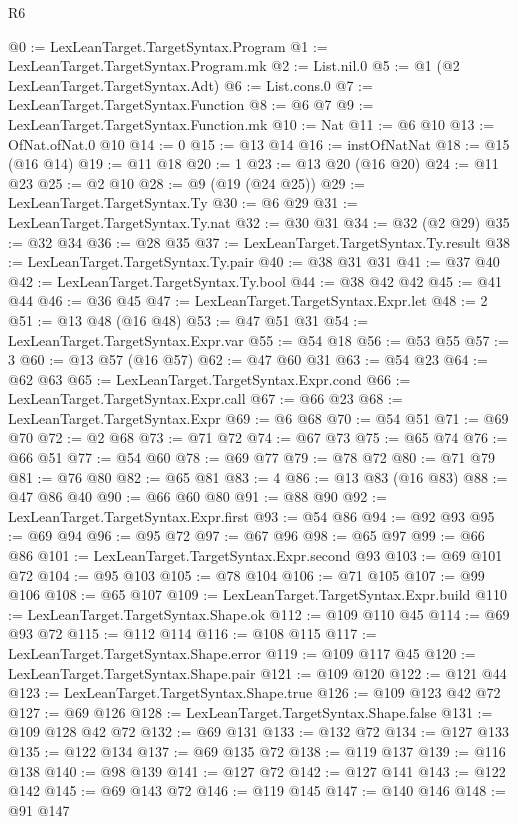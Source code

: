 \begin{lexlean}{R6}
\begin{coremodule}
@0 := LexLeanTarget.TargetSyntax.Program
@1 := LexLeanTarget.TargetSyntax.Program.mk
@2 := List.nil.{0}
@5 := @1 (@2 LexLeanTarget.TargetSyntax.Adt)
@6 := List.cons.{0}
@7 := LexLeanTarget.TargetSyntax.Function
@8 := @6 @7
@9 := LexLeanTarget.TargetSyntax.Function.mk
@10 := Nat
@11 := @6 @10
@13 := OfNat.ofNat.{0} @10
@14 := 0
@15 := @13 @14
@16 := instOfNatNat
@18 := @15 (@16 @14)
@19 := @11 @18
@20 := 1
@23 := @13 @20 (@16 @20)
@24 := @11 @23
@25 := @2 @10
@28 := @9 (@19 (@24 @25))
@29 := LexLeanTarget.TargetSyntax.Ty
@30 := @6 @29
@31 := LexLeanTarget.TargetSyntax.Ty.nat
@32 := @30 @31
@34 := @32 (@2 @29)
@35 := @32 @34
@36 := @28 @35
@37 := LexLeanTarget.TargetSyntax.Ty.result
@38 := LexLeanTarget.TargetSyntax.Ty.pair
@40 := @38 @31 @31
@41 := @37 @40
@42 := LexLeanTarget.TargetSyntax.Ty.bool
@44 := @38 @42 @42
@45 := @41 @44
@46 := @36 @45
@47 := LexLeanTarget.TargetSyntax.Expr.let
@48 := 2
@51 := @13 @48 (@16 @48)
@53 := @47 @51 @31
@54 := LexLeanTarget.TargetSyntax.Expr.var
@55 := @54 @18
@56 := @53 @55
@57 := 3
@60 := @13 @57 (@16 @57)
@62 := @47 @60 @31
@63 := @54 @23
@64 := @62 @63
@65 := LexLeanTarget.TargetSyntax.Expr.cond
@66 := LexLeanTarget.TargetSyntax.Expr.call
@67 := @66 @23
@68 := LexLeanTarget.TargetSyntax.Expr
@69 := @6 @68
@70 := @54 @51
@71 := @69 @70
@72 := @2 @68
@73 := @71 @72
@74 := @67 @73
@75 := @65 @74
@76 := @66 @51
@77 := @54 @60
@78 := @69 @77
@79 := @78 @72
@80 := @71 @79
@81 := @76 @80
@82 := @65 @81
@83 := 4
@86 := @13 @83 (@16 @83)
@88 := @47 @86 @40
@90 := @66 @60 @80
@91 := @88 @90
@92 := LexLeanTarget.TargetSyntax.Expr.first
@93 := @54 @86
@94 := @92 @93
@95 := @69 @94
@96 := @95 @72
@97 := @67 @96
@98 := @65 @97
@99 := @66 @86
@101 := LexLeanTarget.TargetSyntax.Expr.second @93
@103 := @69 @101 @72
@104 := @95 @103
@105 := @78 @104
@106 := @71 @105
@107 := @99 @106
@108 := @65 @107
@109 := LexLeanTarget.TargetSyntax.Expr.build
@110 := LexLeanTarget.TargetSyntax.Shape.ok
@112 := @109 @110 @45
@114 := @69 @93 @72
@115 := @112 @114
@116 := @108 @115
@117 := LexLeanTarget.TargetSyntax.Shape.error
@119 := @109 @117 @45
@120 := LexLeanTarget.TargetSyntax.Shape.pair
@121 := @109 @120
@122 := @121 @44
@123 := LexLeanTarget.TargetSyntax.Shape.true
@126 := @109 @123 @42 @72
@127 := @69 @126
@128 := LexLeanTarget.TargetSyntax.Shape.false
@131 := @109 @128 @42 @72
@132 := @69 @131
@133 := @132 @72
@134 := @127 @133
@135 := @122 @134
@137 := @69 @135 @72
@138 := @119 @137
@139 := @116 @138
@140 := @98 @139
@141 := @127 @72
@142 := @127 @141
@143 := @122 @142
@145 := @69 @143 @72
@146 := @119 @145
@147 := @140 @146
@148 := @91 @147

\end{coremodule}
\end{lexlean}

